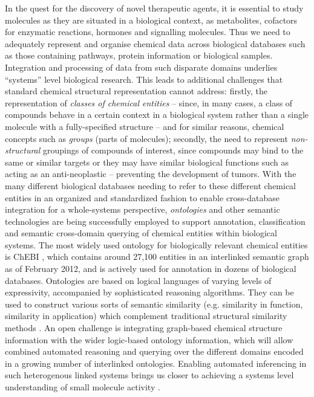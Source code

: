 \documentclass{sig-alternate}
\begin{document}
In the quest for the discovery of novel therapeutic agents, it is
essential to study molecules as they are situated in a biological
context, as metabolites, cofactors for enzymatic reactions, hormones
and signalling molecules. Thus we need to adequately represent and
organise chemical data across biological databases such as those
containing pathways, protein information or biological
samples. Integration and processing of data from such disparate
domains underlies ``systems'' level biological research.  This leads
to additional challenges that standard chemical structural
representation cannot address: firstly, the representation of
\textit{classes of chemical entities} -- since, in many cases, a class
of compounds behave in a certain context in a biological system rather
than a single molecule with a fully-specified structure -- and for
similar reasons, chemical concepts such as \textit{groups} (parts of
molecules); secondly, the need to represent \textit{non-structural}
groupings of compounds of interest, since compounds may bind to the
same or similar targets or they may have similar biological functions
such as acting as an anti-neoplastic -- preventing the development of
tumors. With the many different biological databases needing to refer
to these different chemical entities in an organized and standardized
fashion to enable cross-database integration for a whole-systems
perspective, \textit{ontologies} and other semantic technologies are
being successfully employed to support annotation, classification and
semantic cross-domain querying of chemical entities within biological
systems. The most widely used ontology for biologically relevant
chemical entities is ChEBI \cite{chebi2010}, which contains around 27,100
entities in an interlinked semantic graph as of February 2012, and
is actively used for annotation in dozens of biological databases.
Ontologies are based on logical languages of varying levels of
expressivity, accompanied by sophisticated reasoning algorithms. They
can be used to construct various sorts of semantic similarity
(e.g. similarity in function, similarity in application) which
complement traditional structural similarity methods \cite{couto2010}.
An open challenge is integrating graph-based chemical structure
information with the wider logic-based ontology information, which
will allow combined automated reasoning and querying over the
different domains encoded in a growing number of interlinked
ontologies.
Enabling automated inferencing in such heterogenous linked systems
brings us closer to achieving a systems level understanding of small
molecule activity \cite{Oprea:2007fk}.
\end{document}
